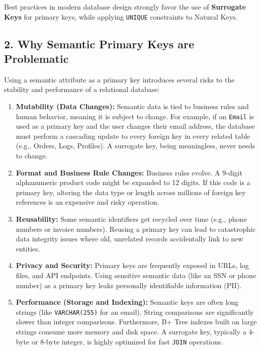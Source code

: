 \documentclass[12pt,a3paper]{article}
\begin{document}
\begin{enumerate}
\begin{tcolorbox}[enhanced,breakable,ansbox,colback=cA!4,colframe=cA,boxrule=0.8pt,arc=5pt,title={\textbf{Answer}},fonttitle=\bfseries\color{white},colbacktitle=cA]
Best practices in modern database design strongly favor the use of \textbf{Surrogate Keys} for primary keys, while applying \texttt{UNIQUE} constraints to Natural Keys.

\subsection*{2. Why Semantic Primary Keys are Problematic}

Using a semantic attribute as a primary key introduces several risks to the stability and performance of a relational database:

\begin{enumerate}
    \item \textbf{Mutability (Data Changes):} Semantic data is tied to business rules and human behavior, meaning it is subject to change. For example, if an \texttt{Email} is used as a primary key and the user changes their email address, the database must perform a cascading update to every foreign key in every related table (e.g., Orders, Logs, Profiles). A surrogate key, being meaningless, never needs to change.
    \item \textbf{Format and Business Rule Changes:} Business rules evolve. A 9-digit alphanumeric product code might be expanded to 12 digits. If this code is a primary key, altering the data type or length across millions of foreign key references is an expensive and risky operation.
    \item \textbf{Reusability:} Some semantic identifiers get recycled over time (e.g., phone numbers or invoice numbers). Reusing a primary key can lead to catastrophic data integrity issues where old, unrelated records accidentally link to new entities.
    \item \textbf{Privacy and Security:} Primary keys are frequently exposed in URLs, log files, and API endpoints. Using sensitive semantic data (like an SSN or phone number) as a primary key leaks personally identifiable information (PII).
    \item \textbf{Performance (Storage and Indexing):} Semantic keys are often long strings (like \texttt{VARCHAR(255)} for an email). String comparisons are significantly slower than integer comparisons. Furthermore, B+ Tree indexes built on large strings consume more memory and disk space. A surrogate key, typically a 4-byte or 8-byte integer, is highly optimized for fast \texttt{JOIN} operations.
\end{enumerate}


\end{tcolorbox}
\end{enumerate}
\end{document}
